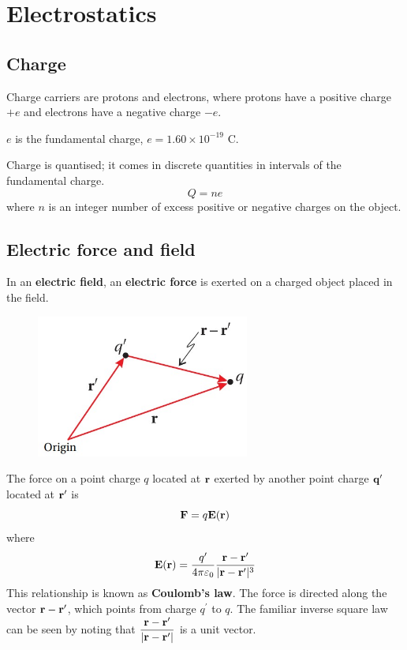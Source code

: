 \section{Electrostatics}
\subsection{Charge}
Charge carriers are protons and electrons, where protons have a positive charge $+e$ and electrons have a negative charge $-e$.

$e$ is the fundamental charge, $e=1.60\times10^{-19}$ \unit{C}.

Charge is quantised; it comes in discrete quantities in intervals of the fundamental charge.
\[ Q=ne \]
where $n$ is an integer number of excess positive or negative charges on the object.

\subsection{Electric force and field}
In an \textbf{electric field}, an \textbf{electric force} is exerted on a charged object placed in the field.

\begin{figure}[H]
    \centering
    \includegraphics[width=7cm]{images/coulomb_law.jpg}
\end{figure}

The force on a point charge $q$ located at $\vb{r}$ exerted by another point charge $\vb{q}^\prime$ located at $\vb{r}^\prime$ is
\begin{equation}
{\vb{F} = q\vb{E}(\vb{r})
}\end{equation}
where
\begin{equation}
{\vb{E}(\vb{r}) = \frac{q^\prime}{4\pi\varepsilon_0} \frac{\vb{r}-\vb{r}^\prime}{|\vb{r}-\vb{r}^\prime|^3}
}\end{equation}
This relationship is known as \textbf{Coulomb’s law}. The force is directed along the vector $\vb{r}-\vb{r}^\prime$, which points from charge $q^\prime$ to $q$. 
The familiar inverse square law can be seen by noting that $\dfrac{\vb{r}-\vb{r}^\prime}{|\vb{r}-\vb{r}^\prime|}$ is a unit vector.

